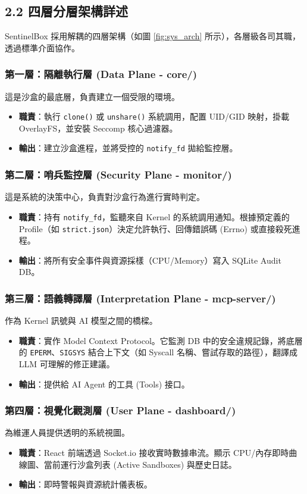 \documentclass[12pt, a4paper, twoside]{article}
\begin{document}
\subsection{2.2 四層分層架構詳述}
SentinelBox 採用解耦的四層架構（如圖 \ref{fig:sys_arch} 所示），各層級各司其職，透過標準介面協作。

\subsubsection{第一層：隔離執行層 (Data Plane - core/)}
這是沙盒的最底層，負責建立一個受限的環境。
\begin{itemize}
    \item \textbf{職責}：執行 \texttt{clone()} 或 \texttt{unshare()} 系統調用，配置 UID/GID 映射，掛載 OverlayFS，並安裝 Seccomp 核心過濾器。
    \item \textbf{輸出}：建立沙盒進程，並將受控的 \texttt{notify\_fd} 拋給監控層。
\end{itemize}

\subsubsection{第二層：哨兵監控層 (Security Plane - monitor/)}
這是系統的決策中心，負責對沙盒行為進行實時判定。
\begin{itemize}
    \item \textbf{職責}：持有 \texttt{notify\_fd}，監聽來自 Kernel 的系統調用通知。根據預定義的 Profile（如 \texttt{strict.json}）決定允許執行、回傳錯誤碼 (Errno) 或直接殺死進程。
    \item \textbf{輸出}：將所有安全事件與資源採樣（CPU/Memory）寫入 SQLite Audit DB。
\end{itemize}

\subsubsection{第三層：語義轉譯層 (Interpretation Plane - mcp-server/)}
作為 Kernel 訊號與 AI 模型之間的橋樑。
\begin{itemize}
    \item \textbf{職責}：實作 Model Context Protocol。它監測 DB 中的安全違規記錄，將底層的 \texttt{EPERM}、\texttt{SIGSYS} 結合上下文（如 Syscall 名稱、嘗試存取的路徑），翻譯成 LLM 可理解的修正建議。
    \item \textbf{輸出}：提供給 AI Agent 的工具 (Tools) 接口。
\end{itemize}

\subsubsection{第四層：視覺化觀測層 (User Plane - dashboard/)}
為維運人員提供透明的系統視圖。
\begin{itemize}
    \item \textbf{職責}：React 前端透過 Socket.io 接收實時數據串流。顯示 CPU/內存即時曲線圖、當前運行沙盒列表 (Active Sandboxes) 與歷史日誌。
    \item \textbf{輸出}：即時警報與資源統計儀表板。
\end{itemize}
\end{document}
